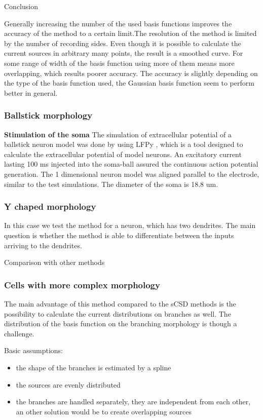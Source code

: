 \documentclass[12pt,a4paper]{article}
\begin{document}
Conclusion

Generally increasing the number of the used basis functions improves the accuracy of the method to a certain limit.The resolution of the method is limited by the number of recording sides. Even though it is possible to calculate the current sources in arbitrary many points, the result is a smoothed curve. For some range of width of the basis function using more of them means more overlapping, which results poorer accuracy. The accuracy is slightly depending on the type of the basis function used, the Gaussian basis function seem to perform better in general.



\subsubsection{Ballstick morphology}


\textbf{Stimulation of the soma}
The simulation of extracellular potential of a ballstick neuron model was done by using LFPy \cite{LFPy}, which is a tool designed to calculate the extracellular potential of model neurons. An excitatory current lasting 100 ms injected into the soma-ball assured the continuous action potential generation.  The 1 dimensional neuron model was aligned parallel to the electrode, similar to the test simulations. The diameter of the soma is 18.8 um. 

\subsubsection{Y chaped morphology}
In this case we test the method for a neuron, which has two dendrites.
The main question is whether the method is able to differentiate between the inputs arriving to the dendrites. 

Comparison with other methods

\subsubsection{Cells with more complex morphology}
The main advantage of this method compared to the sCSD methods is the possibility to calculate the current distributions on branches as well. The distribution of the basis function on the branching morphology is though a challenge.

Basic assumptions:
\begin{itemize}
\item the shape of the branches is estimated by a spline
\item the sources are evenly distributed
\item the branches are handled separately, they are independent from each other, an other solution would be to create overlapping sources
\end{itemize}
\end{document}
